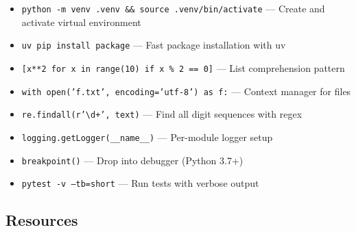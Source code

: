 \documentclass[11pt, a4paper, oneside]{report}
\begin{document}
\begin{cheatsheetbox}
\begin{itemize}[leftmargin=*]
\item \texttt{python -m venv .venv \&\& source .venv/bin/activate} --- Create and activate virtual environment
\item \texttt{uv pip install package} --- Fast package installation with uv
\item \texttt{[x**2 for x in range(10) if x \% 2 == 0]} --- List comprehension pattern
\item \texttt{with open('f.txt', encoding='utf-8') as f:} --- Context manager for files
\item \texttt{re.findall(r'\textbackslash d+', text)} --- Find all digit sequences with regex
\item \texttt{logging.getLogger(\_\_name\_\_)} --- Per-module logger setup
\item \texttt{breakpoint()} --- Drop into debugger (Python 3.7+)
\item \texttt{pytest -v --tb=short} --- Run tests with verbose output
\end{itemize}
\end{cheatsheetbox}

\subsection*{Resources}
\end{document}
